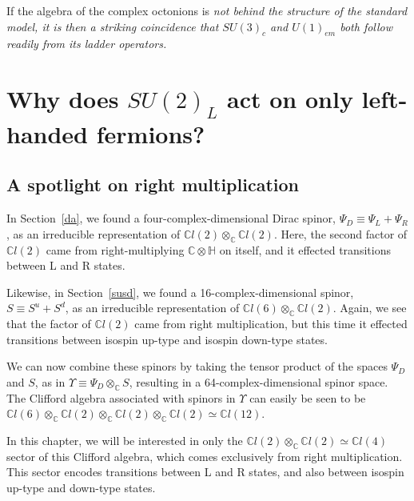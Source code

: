 \documentclass[letterpaper,12pt,titlepage,oneside,final]{book}
\newcommand{\C}{\mathbb{C}}
\newcommand{\CH}{\mathbb{C}\otimes\mathbb{H}}
\newcommand{\CLsix}{\mathbb{C}l(6)}
\newcommand{\CLtwo}{\mathbb{C}l(2)}
\newcommand{\CLfour}{\mathbb{C}l(4)}
\begin{document}

\medskip



 If the algebra of the complex octonions
is \it not \rm behind the structure of the standard model, it is
then a striking coincidence that $SU(3)_c$ and $U(1)_{em}$ both
follow readily from its ladder operators. 



\chapter{Why does $SU(2)_L$ act on only left-handed fermions?\label{su2L}}

\section{A spotlight on right multiplication  }

In Section~\ref{da}, we found a four-complex-dimensional Dirac spinor, $\Psi_D\equiv\Psi_L+\Psi_R$, as an irreducible representation of  $\CLtwo \otimes_{\C} \CLtwo$.  Here, the second factor of $\CLtwo$ came from right-multiplying $\CH$ on itself, and it effected transitions between L and R states.

Likewise, in Section~\ref{susd}, we found a 16-complex-dimensional spinor, $S\equiv S^u+S^d$, as an irreducible representation of $\CLsix \otimes_{\C} \CLtwo$.  Again, we see that the factor of $\CLtwo$  came from right multiplication, but this time it effected transitions between isospin up-type and isospin down-type states.


We can now combine these spinors by taking the tensor product of the spaces $\Psi_D$ and $S$, as  in $\Upsilon\equiv \Psi_D \otimes_{\C} S$, resulting in a 64-complex-dimensional spinor space.  The Clifford algebra associated with spinors in $\Upsilon$  can easily be seen to be $\CLsix\otimes_{\C}\CLtwo\otimes_{\C}\CLtwo\otimes_{\C}\CLtwo\simeq \C l(12)$.

In this chapter, we will be interested in only the $\CLtwo\otimes_{\C}\CLtwo \simeq \CLfour$ sector of this Clifford algebra, which comes exclusively from right multiplication.  This sector encodes transitions between L and R states, and also between isospin up-type and down-type states.  
\end{document}
